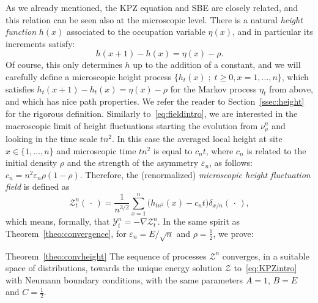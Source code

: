 \documentclass[AHL,Unicode,longabstracts]{cedram}
\newcommand{\mc}[1]{{\mathcal #1}}
\renewcommand{\mc}[1]{{\mathcal #1}}
\renewcommand{\geq}{\geqslant}
\begin{document}
As we already mentioned, the KPZ equation and SBE are closely related, and this relation can be seen also at the microscopic level. There is a natural \emph{height function} $h(x)$ associated to the occupation variable $\eta(x)$, and in particular its increments satisfy:
\[
h(x+1)-h(x) = \eta(x) -\rho.
\]
Of course, this only determines $h$ up to the addition of a constant, and we will carefully define a microscopic height process $\{h_t(x)\; ; \; t \geq 0, x=1,\dots,n\}$, which satisfies $h_t(x+1)-h_t(x) = \eta(x) -\rho$ for the Markov process $\eta_t$ from above, and which has nice path properties. We refer the reader to Section~\ref{ssec:height} for the rigorous definition. Similarly to~\eqref{eq:fieldintro}, we are interested in the macroscopic limit of height fluctuations starting the evolution from $\nu_\rho^n$ and looking in the time scale $tn^2$. In this case the averaged local height at site $x \in \{1,\dots,n\}$ and microscopic time $tn^2$ is equal to $c_n t$, where $c_n$ is related to the initial density $\rho$ and the strength of the asymmetry $\varepsilon_n$, as follows: $c_n=n^2\varepsilon_n\rho(1-\rho)$. Therefore, the (renormalized) \emph{microscopic height fluctuation field} is defined as
\begin{equation}\label{eq:height-field-intro}
\mc Z_t^n({\,\cdot\,}) = \frac{1}{n^{3/2}} \sum_{x=1}^n \big(h_{tn^2}(x)-c_n t\big)\delta_{x/n}({\,\cdot\,}),
\end{equation}
which means, formally, that $\mc Y_t^n = -\nabla \mc Z_t^n$. In the same spirit as Theorem~\ref{theo:convergence}, for $\varepsilon_n=E/\sqrt n$ and $\rho=\frac12$, we prove:

\begin{enonce*}{Theorem~\ref{theo:convheight}}
The sequence of processes $\mc Z^n$ converges, in a suitable space of distributions, towards the unique energy solution $\mc Z$ to~\eqref{eq:KPZintro} with Neumann boundary conditions, with the same parameters $A=1$, $B=E$ and $C=\frac12$.
\end{enonce*}
\end{document}
